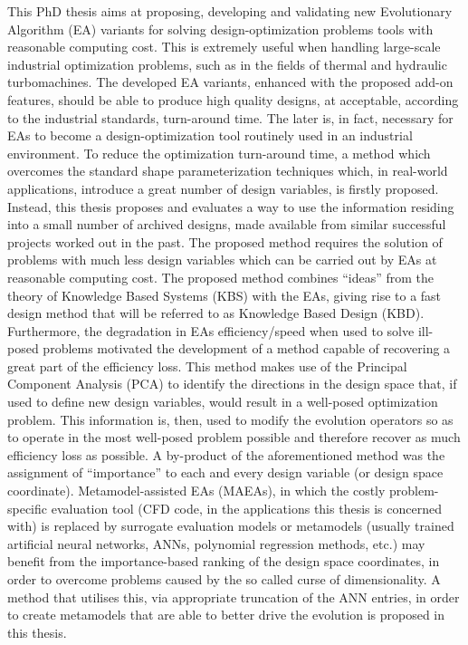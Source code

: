 This PhD thesis aims at proposing, developing and validating new Evolutionary Algorithm (EA) variants for solving design-optimization problems tools with reasonable computing cost. This is extremely useful when handling large-scale industrial optimization problems, such as in the fields of thermal and hydraulic turbomachines. The developed EA variants, enhanced with the proposed add-on features, should be able to produce high quality designs, at acceptable, according to the industrial standards, turn-around time. The later is, in fact, necessary for EAs to become a design-optimization tool routinely used in an industrial environment. To reduce the optimization turn-around time, a method which overcomes the standard shape parameterization techniques which, in real-world applications, introduce a great number of design variables, is firstly proposed. Instead, this thesis proposes and evaluates a way to use the information residing into a small number of archived designs, made available from similar successful projects worked out in the past. The proposed method requires the solution of problems with much less design variables which can be carried out by EAs at reasonable computing cost. The proposed method combines ``ideas'' from the theory of Knowledge Based Systems (KBS) with the  EAs, giving rise to a fast design method that will be referred to as Knowledge Based Design (KBD). Furthermore, the degradation in EAs efficiency/speed when used to solve ill-posed problems motivated the development of a method capable of recovering a great part of the efficiency loss. This method makes use of the Principal Component Analysis (PCA) to identify the directions in the design space that, if used to define new design variables, would result in a well-posed optimization problem.  This information is, then, used to modify the evolution operators so as to operate in the most well-posed problem possible and therefore recover as much efficiency loss as possible.  A by-product of the aforementioned method was the assignment of ``importance'' to each and every design variable (or design space coordinate). Metamodel-assisted EAs (MAEAs), in which the costly problem-specific evaluation tool (CFD code, in the applications this thesis is concerned with) is replaced by surrogate evaluation models or metamodels (usually trained artificial neural networks, ANNs, polynomial regression methods, etc.) may benefit from the importance-based ranking of the design space coordinates, in order to overcome problems caused by the so called curse of dimensionality. A method that utilises this, via appropriate truncation of the ANN entries, in order to create metamodels that are able to better drive the evolution is proposed in this thesis.  

